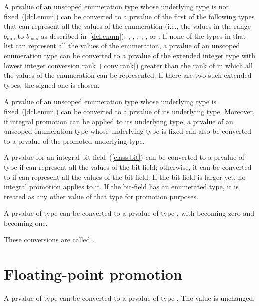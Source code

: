 \pnum
{}%
A prvalue of an unscoped enumeration type whose underlying type is not
fixed~(\ref{dcl.enum}) can be converted to a prvalue of the first of the following
types that can represent all the values of the enumeration (i.e., the values in the
range $b_\text{min}$ to $b_\text{max}$ as described in~\ref{dcl.enum}): ,
, , ,
, or . If none of the types in that
list can represent all the values of the enumeration, a prvalue of an unscoped
enumeration type can be converted to a prvalue of the extended integer type with lowest
integer conversion rank~(\ref{conv.rank}) greater than the rank of 
in which all the values of the enumeration can be represented. If there are
two such extended types, the signed one is chosen.

\pnum
A prvalue of an unscoped enumeration type whose underlying type is
fixed~(\ref{dcl.enum}) can be converted to a prvalue of its underlying type. Moreover,
if integral promotion can be applied to its underlying type, a prvalue of an unscoped
enumeration type whose underlying type is fixed can also be converted to a prvalue of
the promoted underlying type.

\pnum
A prvalue for an integral bit-field~(\ref{class.bit}) can be converted
to a prvalue of type  if  can represent all the
values of the bit-field; otherwise, it can be converted to
 if  can represent all the
values of the bit-field. If the bit-field is larger yet, no integral
promotion applies to it. If the bit-field has an enumerated type, it is
treated as any other value of that type for promotion purposes.

\pnum
{}%
A prvalue of type  can be converted to a prvalue of type
, with  becoming zero and  becoming
one.

\pnum
These conversions are called .

\section[conv.fpprom]{Floating-point promotion}

\pnum
{}%
A prvalue of type  can be converted to a prvalue of type
. The value is unchanged.

